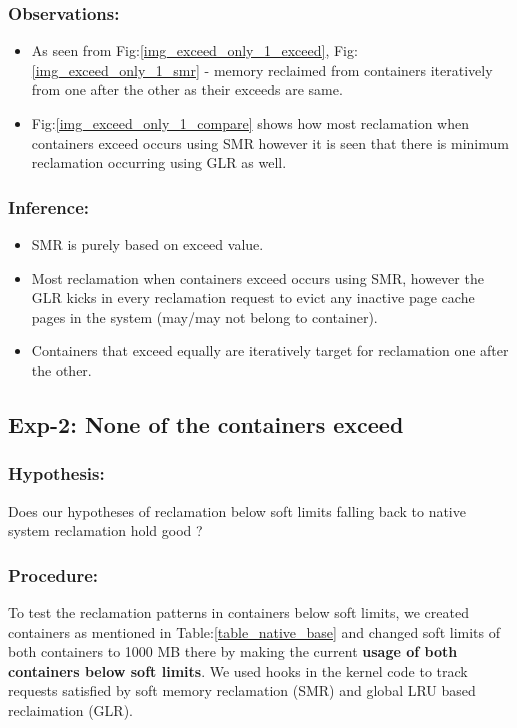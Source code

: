 	\subsubsection{Observations:}
	
	  \begin{itemize}
	    \item As seen from Fig:\ref{img_exceed_only_1_exceed}, Fig:\ref{img_exceed_only_1_smr} - memory reclaimed from containers 
iteratively from one after the other as their exceeds are same.
	    \item Fig:\ref{img_exceed_only_1_compare} shows how most reclamation when containers exceed occurs using SMR however it is seen 
that there is minimum reclamation occurring using GLR as well.
	  \end{itemize}

	\subsubsection{Inference:}	
	  \begin{itemize}
	    \item SMR is purely based on exceed value.
	    \item Most reclamation when containers exceed occurs using SMR, however the GLR kicks in every reclamation request to evict any 
inactive page cache pages in the system (may/may not belong to container).
	    \item Containers that exceed equally are iteratively target for reclamation one after the other.
	  \end{itemize}

    
    \subsection{Exp-2: None of the containers exceed}
   
    \subsubsection{Hypothesis:}
      Does our hypotheses of reclamation below soft limits falling back to native system reclamation hold good ?
      
    \subsubsection{Procedure:}  
      To test the reclamation patterns in containers below soft limits, we created containers as mentioned in Table:\ref{table_native_base} 
and changed soft limits of both containers to 1000 MB there by making the current \textbf{usage of both containers below soft limits}. We 
used hooks in the kernel code to track requests satisfied by soft memory reclamation (SMR) and global LRU based reclaimation (GLR).
     
